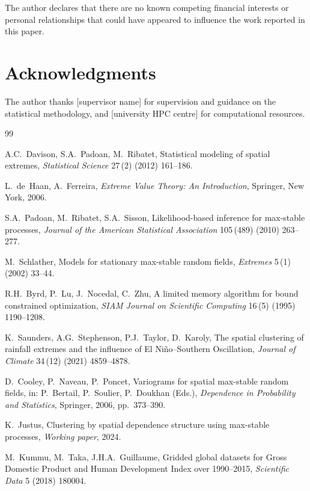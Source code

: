 \documentclass[a4paper]{elsarticle}
\begin{document}
The author declares that there are no known competing financial interests
or personal relationships that could have appeared to influence the work
reported in this paper.

\section*{Acknowledgments}

The author thanks [supervisor name] for supervision and guidance on the
statistical methodology, and [university HPC centre] for computational resources.

\begin{thebibliography}{99}

A.C.~Davison, S.A.~Padoan, M.~Ribatet,
Statistical modeling of spatial extremes,
\textit{Statistical Science} 27\,(2) (2012) 161--186.

L.~de~Haan, A.~Ferreira,
\textit{Extreme Value Theory: An Introduction},
Springer, New York, 2006.

S.A.~Padoan, M.~Ribatet, S.A.~Sisson,
Likelihood-based inference for max-stable processes,
\textit{Journal of the American Statistical Association}
105\,(489) (2010) 263--277.

M.~Schlather,
Models for stationary max-stable random fields,
\textit{Extremes} 5\,(1) (2002) 33--44.

R.H.~Byrd, P.~Lu, J.~Nocedal, C.~Zhu,
A limited memory algorithm for bound constrained optimization,
\textit{SIAM Journal on Scientific Computing}
16\,(5) (1995) 1190--1208.

K.~Saunders, A.G.~Stephenson, P.J.~Taylor, D.~Karoly,
The spatial clustering of rainfall extremes and the influence of
El Ni\~{n}o--Southern Oscillation,
\textit{Journal of Climate} 34\,(12) (2021) 4859--4878.

D.~Cooley, P.~Naveau, P.~Poncet,
Variograms for spatial max-stable random fields,
in: P.~Bertail, P.~Soulier, P.~Doukhan (Eds.),
\textit{Dependence in Probability and Statistics},
Springer, 2006, pp.~373--390.

K.~Justus,
Clustering by spatial dependence structure using max-stable processes,
\textit{Working paper}, 2024.

M.~Kummu, M.~Taka, J.H.A.~Guillaume,
Gridded global datasets for Gross Domestic Product and Human
Development Index over 1990--2015,
\textit{Scientific Data} 5 (2018) 180004.

\end{thebibliography}
\end{document}
